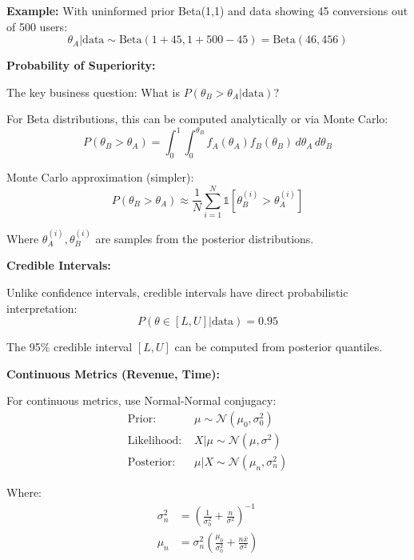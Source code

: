 \textbf{Example:} With uninformed prior Beta(1,1) and data showing 45 conversions out of 500 users:
\begin{equation}
\theta_A | \text{data} \sim \text{Beta}(1 + 45, 1 + 500 - 45) = \text{Beta}(46, 456)
\end{equation}

\textbf{Probability of Superiority:}

The key business question: What is $P(\theta_B > \theta_A | \text{data})$?

For Beta distributions, this can be computed analytically or via Monte Carlo:
\begin{equation}
P(\theta_B > \theta_A) = \int_0^1 \int_0^{\theta_B} f_A(\theta_A) f_B(\theta_B) \, d\theta_A \, d\theta_B
\end{equation}

Monte Carlo approximation (simpler):
\begin{equation}
P(\theta_B > \theta_A) \approx \frac{1}{N} \sum_{i=1}^{N} \mathbb{1}[\theta_B^{(i)} > \theta_A^{(i)}]
\end{equation}

Where $\theta_A^{(i)}, \theta_B^{(i)}$ are samples from the posterior distributions.

\textbf{Credible Intervals:}

Unlike confidence intervals, credible intervals have direct probabilistic interpretation:
\begin{equation}
P(\theta \in [L, U] | \text{data}) = 0.95
\end{equation}

The 95\% credible interval $[L, U]$ can be computed from posterior quantiles.

\textbf{Continuous Metrics (Revenue, Time):}

For continuous metrics, use Normal-Normal conjugacy:
\begin{align}
\text{Prior: } & \mu \sim \mathcal{N}(\mu_0, \sigma_0^2) \\
\text{Likelihood: } & X | \mu \sim \mathcal{N}(\mu, \sigma^2) \\
\text{Posterior: } & \mu | X \sim \mathcal{N}(\mu_n, \sigma_n^2)
\end{align}

Where:
\begin{align}
\sigma_n^2 &= \left(\frac{1}{\sigma_0^2} + \frac{n}{\sigma^2}\right)^{-1} \\
\mu_n &= \sigma_n^2 \left(\frac{\mu_0}{\sigma_0^2} + \frac{n \bar{x}}{\sigma^2}\right)
\end{align}

